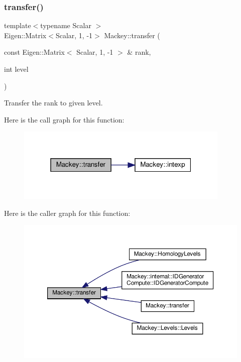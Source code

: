 \subsubsection{\texorpdfstring{transfer()}{transfer()}\hspace{0.1cm}{\footnotesize\ttfamily [1/6]}}
{\footnotesize\ttfamily template$<$typename Scalar $>$ \\
Eigen\+::\+Matrix$<$Scalar, 1, -\/1$>$ Mackey\+::transfer (\begin{DoxyParamCaption}\item[{const Eigen\+::\+Matrix$<$ Scalar, 1, -\/1 $>$ \&}]{rank,  }\item[{int}]{level }\end{DoxyParamCaption})}



Transfer the rank to given level. 

Here is the call graph for this function\+:\nopagebreak
\begin{figure}[H]
\begin{center}
\leavevmode
\includegraphics[width=289pt]{namespaceMackey_a671613d53fc3b0c9c4b115bc8b2797e6_cgraph}
\end{center}
\end{figure}
Here is the caller graph for this function\+:\nopagebreak
\begin{figure}[H]
\begin{center}
\leavevmode
\includegraphics[width=350pt]{namespaceMackey_a671613d53fc3b0c9c4b115bc8b2797e6_icgraph}
\end{center}
\end{figure}
\mbox{\label{namespaceMackey_ad7524839b58c80d4b2c54827e4833b12}} 
